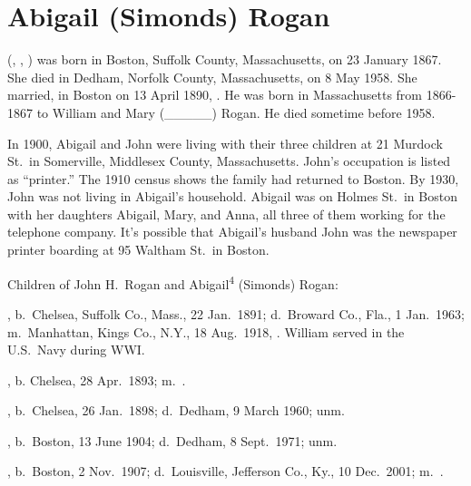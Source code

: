 \section{Abigail (Simonds) Rogan}

 (, , ) was born in Boston, Suffolk County, Massachusetts, on 23 January 1867.\cite{Abigail4SimondsBirth} She died in Dedham, Norfolk County, Massachusetts, on 8 May 1958.\cite{Abigail4SimondsDeath} She married, in Boston on 13 April 1890, . He was born in Massachusetts from 1866-1867 to William and Mary (\_\_\_\_\_) Rogan.\cite{Census1880JohnRogan} He died sometime before 1958.\cite{Abigail4SimondsDeath}

In 1900, Abigail and John were living with their three children at 21 Murdock St.\ in Somerville, Middlesex County, Massachusetts. John's occupation is listed as ``printer.''\cite{Census1900AbigailSimonds} The 1910 census shows the family had returned to Boston.\cite{Census1910AbigailSimonds} By 1930, John was not living in Abigail's household. Abigail was on Holmes St.\ in Boston with her daughters Abigail, Mary, and Anna, all three of them working for the telephone company.\cite{Census1930AbigailSimonds} It's possible that Abigail's husband John was the newspaper printer boarding at 95 Waltham St.\ in Boston.\cite{Census1930JohnRogan}

\begin{KidsIntro}
	Children of John H.\ Rogan and Abigail\textsuperscript{4} (Simonds) Rogan:
\end{KidsIntro}

\begin{Kids}
	, b.\ Chelsea, Suffolk Co., Mass., 22 Jan.\ 1891;\cite{William5RoganBirth} d.\ Broward Co., Fla., 1 Jan.\ 1963;\cite{William5RoganDeath,William5RoganHeadstone} m.\ Manhattan, Kings Co., N.Y., 18 Aug.\ 1918, .\cite{William5RoganMarriage} William served in the U.S.\ Navy during WWI.\cite{William5RoganHeadstone}
	
	, b. Chelsea, 28 Apr.\ 1893;\cite{Marguerite5RoganBirth} m.\ .\cite{Census1940Marguerite5Rogan}
	
	, b.\ Chelsea, 26 Jan.\ 1898;\cite{Abigail5RoganBirth} d.\ Dedham, 9 March 1960; unm.\cite{Abigail5RoganDeath}
	
	, b.\ Boston, 13 June 1904;\cite{Mary5RoganBirth} d.\ Dedham, 8 Sept.\ 1971; unm.\cite{Mary5RoganDeath}
	
	, b.\ Boston, 2 Nov.\ 1907;\cite{Anne5RoganBirth} d.\ Louisville, Jefferson Co., Ky., 10 Dec.\ 2001;\cite{Anne5RoganDeath} m.\ .\cite{Census1940Anne5Rogan}
\end{Kids}